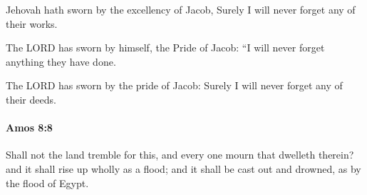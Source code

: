 			\begin{versebox}
					\item[BHS] 
					\item[LXX] 
					\item[ASV] Jehovah hath sworn by the excellency of Jacob, Surely I will never forget any of their works.
					\item[NIV] The LORD has sworn by himself, the Pride of Jacob: “I will never forget anything they have done.
					\item[NRSV] The LORD has sworn by the pride of Jacob: Surely I will never forget any of their deeds.
			\end{versebox}

		\paragraph{Amos 8:8} %
			\label{AMOS-8-8}

			Shall not the land tremble for this, and every one mourn that dwelleth therein? and it shall rise up wholly as a flood; and it shall be cast out and drowned, as by the flood of Egypt.

